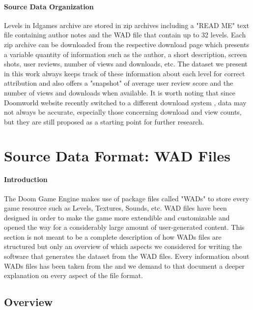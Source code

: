 \paragraph{Source Data Organization} Levels in Idgames archive are stored in zip archives including a "READ ME" text file containing author notes and the \gls{WAD} file that contain up to 32 levels. 
Each zip archive can be downloaded from the respective download page which presents a variable quantity of information such as the author, a short description, screen shots, user reviews, number of views and downloads, etc.
The dataset we present in this work always keeps track of these information about each level for correct attribution and also offers a "snapshot" of average user review score and the number of views and downloads when available. It is worth noting that since Doomworld website recently switched to a different download system \cite{wiki:doomworld}, data may not always be accurate, especially those concerning download and view counts, but they are still proposed as a starting point for further research. 
\section{Source Data Format: WAD Files}
\label{sec:WAD} 
\paragraph{Introduction} The Doom Game Engine \cite{doomengine} makes use of package files called "\glspl{WAD}" to store every game resource such as Levels, Textures, Sounds, etc. 
\gls{WAD} files have been designed in order to make the game more extendible and customizable and opened the way for a considerably large amount of user-generated content. This section is not meant to be a complete description of how \glspl{WAD} files are structured but only an overview of which aspects we considered for writing the software that generates the dataset from the \gls{WAD} files. Every information about \glspl{WAD} files has been taken from the  \cite{doomspecs} and we demand to that document a deeper explanation on every aspect of the file format.
\subsection{Overview}
